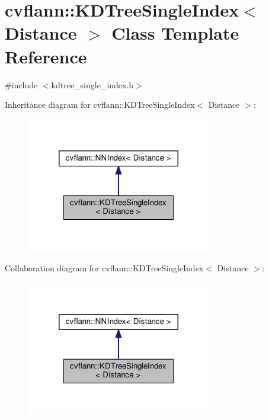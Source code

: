 \hypertarget{classcvflann_1_1KDTreeSingleIndex}{\section{cvflann\-:\-:K\-D\-Tree\-Single\-Index$<$ Distance $>$ Class Template Reference}
\label{classcvflann_1_1KDTreeSingleIndex}
}


{\ttfamily \#include $<$kdtree\-\_\-single\-\_\-index.\-h$>$}



Inheritance diagram for cvflann\-:\-:K\-D\-Tree\-Single\-Index$<$ Distance $>$\-:\nopagebreak
\begin{figure}[H]
\begin{center}
\leavevmode
\includegraphics[width=228pt]{classcvflann_1_1KDTreeSingleIndex__inherit__graph}
\end{center}
\end{figure}


Collaboration diagram for cvflann\-:\-:K\-D\-Tree\-Single\-Index$<$ Distance $>$\-:\nopagebreak
\begin{figure}[H]
\begin{center}
\leavevmode
\includegraphics[width=228pt]{classcvflann_1_1KDTreeSingleIndex__coll__graph}
\end{center}
\end{figure}
